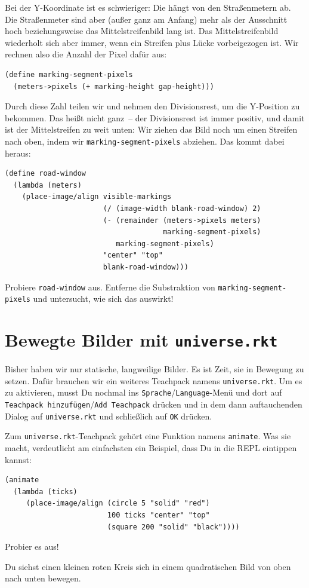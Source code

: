 Bei der Y-Koordinate ist es schwieriger: Die hängt von den
Straßenmetern ab.  Die Straßenmeter sind aber (außer ganz am Anfang)
mehr als der Ausschnitt hoch beziehungsweise das Mittelstreifenbild
lang ist.  Das Mittelstreifenbild wiederholt sich aber immer, wenn ein
Streifen plus Lücke vorbeigezogen ist.  Wir rechnen also die Anzahl
der Pixel dafür aus:
%
\begin{lstlisting}
(define marking-segment-pixels
  (meters->pixels (+ marking-height gap-height)))
\end{lstlisting}
%
Durch diese Zahl teilen wir und nehmen den Divisionsrest, um die
Y-Position zu bekommen.  Das heißt nicht ganz~-- der Divisionsrest ist immer
positiv, und damit ist der Mittelstreifen zu weit unten: Wir ziehen
das Bild noch um einen Streifen nach oben, indem wir
\lstinline{marking-segment-pixels} abziehen.  Das kommt dabei heraus:
%
\begin{lstlisting}
(define road-window
  (lambda (meters)
    (place-image/align visible-markings
                       (/ (image-width blank-road-window) 2)
                       (- (remainder (meters->pixels meters)
                                     marking-segment-pixels)
                          marking-segment-pixels)
                       "center" "top"
                       blank-road-window)))
\end{lstlisting}
%
\begin{aufgabeinline}
  Probiere \lstinline{road-window} aus.  Entferne die Substraktion von
  \lstinline{marking-segment-pixels} und untersucht, wie sich das
  auswirkt!
\end{aufgabeinline}
%

\section{Bewegte Bilder mit \texttt{universe.rkt}}

Bisher haben wir nur statische, langweilige Bilder.  Es ist Zeit, sie
in Bewegung zu setzen.  Dafür brauchen wir ein weiteres Teachpack
namens \texttt{universe.rkt}.  Um es zu aktivieren, musst Du nochmal
ins \texttt{Sprache}/\texttt{Language}-Menü und dort auf
\texttt{Teachpack hinzufügen}/\texttt{Add Teachpack} drücken und in
dem dann auftauchenden Dialog auf \texttt{universe.rkt} und
schließlich auf \texttt{OK} drücken.

Zum \texttt{universe.rkt}-Teachpack gehört eine Funktion namens
\lstinline{animate}.  Was sie macht,
verdeutlicht am einfachsten ein Beispiel, dass Du in die REPL
eintippen kannst:
%
\begin{lstlisting}
(animate
  (lambda (ticks)
     (place-image/align (circle 5 "solid" "red") 
                        100 ticks "center" "top" 
                        (square 200 "solid" "black"))))
\end{lstlisting}
%
\begin{aufgabeinline}
  Probier es aus!
\end{aufgabeinline}
%
Du siehst einen kleinen roten Kreis sich in einem quadratischen Bild
von oben nach unten bewegen. 

